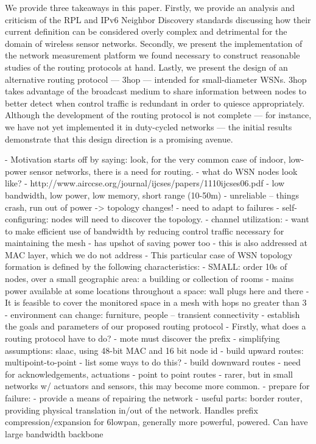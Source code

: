 We provide three takeaways in this paper.
Firstly, we provide an analysis and criticism of the RPL and IPv6 Neighbor Discovery standards discussing how their current definition can be considered overly complex and detrimental for the domain of wireless sensor networks.
Secondly, we present the implementation of the network measurement platform we found necessary to construct reasonable studies of the routing protocols at hand.
Lastly, we present the design of an alternative routing protocol --- 3hop --- intended for small-diameter WSNs.
3hop takes advantage of the broadcast medium to share information between nodes to better detect when control traffic is redundant in order to quiesce appropriately.
Although the development of the routing protocol is not complete --- for instance, we have not yet implemented it in duty-cycled networks --- the initial results demonstrate that this design direction is a promising avenue.

- Motivation starts off by saying: look, for the very common case of indoor, low-power
  sensor networks, there is a need for routing.
- what do WSN nodes look like?
    - http://www.airccse.org/journal/ijcses/papers/1110ijcses06.pdf
    - low bandwidth, low power, low memory, short range (10-50m)
    - unreliable -- things crash, run out of power -> topology changes!
      - need to adapt to failures
    - self-configuring: nodes will need to discover the topology.
    - channel utilization:
      - want to make efficient use of bandwidth by reducing control traffic
        necessary for maintaining the mesh
      - has upshot of saving power too
      - this is also addressed at MAC layer, which we do not address
- This particular case of WSN topology formation is defined by the following characteristics:
    - SMALL: order 10s of nodes, over a small geographic area: a building or collection of rooms
    - mains power available at some locations throughout a space: wall plugs here and there
    - It is feasible to cover the monitored space in a mesh with hops no greater than 3
    - environment can change: furniture, people -- transient connectivity
- establish the goals and parameters of our proposed routing protocol
- Firstly, what does a routing protocol have to do?
    - mote must discover the prefix
      - simplifying assumptions: slaac, using 48-bit MAC and 16 bit node id
    - build upward routes: multipoint-to-point
      - list some ways to do this?
    - build downward routes
      - need for acknowledgements, actuations
    - point to point routes
      - rarer, but in small networks w/ actuators and sensors, this may become more common.
    - prepare for failure:
      - provide a means of repairing the network
    - useful parts: border router, providing physical translation in/out of
      the network. Handles prefix compression/expansion for 6lowpan, generally
      more powerful, powered. Can have large bandwidth backbone
\fi

